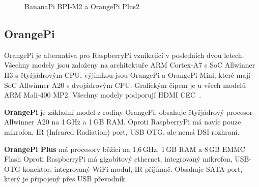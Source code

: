 	
	\begin{figure}[!ht]
	\vspace{-10pt}
    \centering
			\hspace*{5mm}
			\caption{BananaPi BPI-M2 a OrangePi Plus2}
			\vspace{-10pt}	
\end{figure}
	
	

	\subsection{OrangePi}
	OrangePi je alternativa pro RaspberryPi vznikající v posledních dvou letech. Všechny modely jsou založeny na architektuře ARM Cortex-A7 s SoC Allwinner H3 s čtyřjádrovým CPU, výjimkou jsou OrangePi a OrangePi Mini, které mají SoC Allwinner A20 s dvojádrovým CPU. Grafickým čipem je u všech modelů ARM Mali-400 MP2. Všechny modely podporují HDMI CEC~\cite{OrangePi}.

		\textbf{OrangePi} je základní model z rodiny OrangePi, obsahuje čtyřjádrový procesor Allwinner A20 na 1\,GHz a 1\,GB RAM. Oproti RaspberryPi má navíc pouze mikrofon, IR (Infrared Radiation) port, USB OTG, ale nemá DSI rozhraní.
		
		\textbf{OrangePi Plus } má procesory běžící na 1,6\,GHz, 1\,GB RAM a 8\,GB EMMC Flash Oproti  RaspberryPi má gigabitový ethernet, integrovaný mikrofon, USB-OTG konektor, integrovaný WiFi modul, IR přijímač. Obsahuje SATA port, který je připojený přes USB převodník.
		
